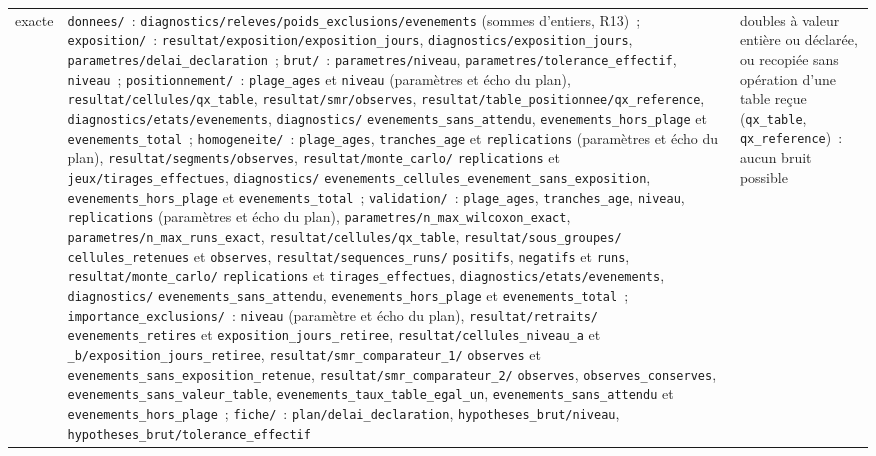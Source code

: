 \documentclass[a4paper,11pt]{article}
\newcommand{\code}[1]{\texttt{\small #1}}
\begin{document}
{\begin{longtable}{@{}p{1.4cm}>{\raggedright\arraybackslash}p{9.4cm}p{3.8cm}@{}}
exacte & \code{donnees/}~: \code{diagnostics/releves/poids\_exclusions/evenements} (sommes d'entiers, R13)~; \code{exposition/}~: \code{resultat/exposition/exposition\_jours}, \code{diagnostics/exposition\_jours}, \code{parametres/delai\_declaration}~; \code{brut/}~: \code{parametres/niveau}, \code{parametres/tolerance\_effectif}, \code{niveau}~; \code{positionnement/}~: \code{plage\_ages} et \code{niveau} (paramètres et écho du plan), \code{resultat/cellules/qx\_table}, \code{resultat/smr/observes}, \code{resultat/table\_positionnee/qx\_reference}, \code{diagnostics/etats/evenements}, \code{diagnostics/} \code{evenements\_sans\_attendu}, \code{evenements\_hors\_plage} et \code{evenements\_total}~; \code{homogeneite/}~: \code{plage\_ages}, \code{tranches\_age} et \code{replications} (paramètres et écho du plan), \code{resultat/segments/observes}, \code{resultat/monte\_carlo/} \code{replications} et \code{jeux/tirages\_effectues}, \code{diagnostics/} \code{evenements\_cellules\_}\allowbreak\code{evenement\_sans\_exposition}, \code{evenements\_hors\_plage} et \code{evenements\_total}~; \code{validation/}~: \code{plage\_ages}, \code{tranches\_age}, \code{niveau}, \code{replications} (paramètres et écho du plan), \code{parametres/n\_max\_wilcoxon\_exact}, \code{parametres/n\_max\_runs\_exact}, \code{resultat/cellules/qx\_table}, \code{resultat/sous\_groupes/} \code{cellules\_retenues} et \code{observes}, \code{resultat/sequences\_runs/} \code{positifs}, \code{negatifs} et \code{runs}, \code{resultat/monte\_carlo/} \code{replications} et \code{tirages\_effectues}, \code{diagnostics/etats/evenements}, \code{diagnostics/} \code{evenements\_sans\_attendu}, \code{evenements\_hors\_plage} et \code{evenements\_total}~; \code{importance\_exclusions/}~: \code{niveau} (paramètre et écho du plan), \code{resultat/retraits/} \code{evenements\_retires} et \code{exposition\_jours\_retiree}, \code{resultat/cellules\_niveau\_a} et \code{\_b/exposition\_jours\_retiree}, \code{resultat/smr\_comparateur\_1/} \code{observes} et \code{evenements\_sans\_exposition\_retenue}, \code{resultat/smr\_comparateur\_2/} \code{observes}, \code{observes\_conserves}, \code{evenements\_sans\_valeur\_table}, \code{evenements\_taux\_table\_egal\_un}, \code{evenements\_sans\_attendu} et \code{evenements\_hors\_plage}~; \code{fiche/}~: \code{plan/delai\_declaration}, \code{hypotheses\_brut/niveau}, \code{hypotheses\_brut/tolerance\_effectif} & doubles à valeur entière ou déclarée, ou recopiée sans opération d'une table reçue (\code{qx\_table}, \code{qx\_reference})~: aucun bruit possible \\

\end{longtable}}
\end{document}
